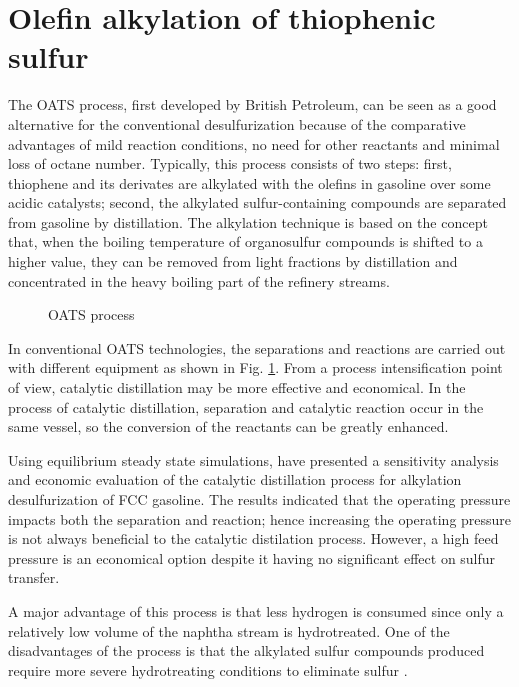 \section{Olefin alkylation of thiophenic sulfur}

The OATS process, first developed by British Petroleum, can be seen as a good alternative for the conventional desulfurization because of the comparative advantages of mild reaction conditions, no need for other reactants and minimal loss of octane number. Typically, this process consists of two steps: first, thiophene and its derivates are alkylated with the olefins in gasoline over some acidic catalysts; second, the alkylated sulfur-containing compounds are separated from gasoline by distillation. The alkylation technique is based on the concept that, when the boiling temperature of organosulfur compounds is shifted to a higher value, they can be removed from light fractions by distillation and concentrated in the heavy boiling part of the refinery streams. 


\begin{figure}[htbp]
\centering
{}
\caption{OATS process \citep{el2015handbook}}
\label{fig:OATS}
\end{figure}

In conventional OATS technologies, the separations and reactions are carried out with different equipment as shown in Fig. \ref{fig:OATS}. From a process intensification point of view, catalytic distillation may be more effective and economical. In the process of catalytic distillation, separation and catalytic reaction occur in the same vessel, so the conversion of the reactants can be greatly enhanced.

Using equilibrium steady state simulations, \cite{JCTB:JCTB4604} have presented a sensitivity analysis and economic evaluation of the catalytic distillation process for alkylation desulfurization of FCC gasoline.  The results indicated that the operating pressure impacts both the separation and reaction; hence increasing the operating pressure is not always beneficial to the catalytic distilation process. However, a high feed pressure is an economical option despite it having no significant effect on sulfur transfer.

A major advantage of this process is that less hydrogen is consumed since only a relatively low volume of the naphtha stream is hydrotreated. One of the disadvantages of the process is that the alkylated sulfur compounds produced require more severe hydrotreating conditions to eliminate sulfur \citep{el2015handbook}.


